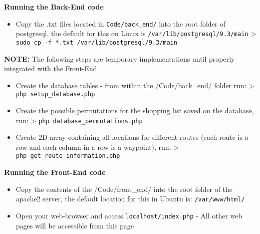 \documentclass[10pt, a4paper, onecolumn]{scrartcl}
\begin{document}
	\textbf{Running the Back-End code} 
	
		\begin{itemize}[noitemsep]
			\item 	Copy the .txt files located in \texttt{Code/back\_end/} into the root
			folder of postgresql, the default for this on Linux is
			\texttt{/var/lib/postgresql/9.3/main} \textgreater{}
			\texttt{sudo\ cp\ -f\ *.txt\ /var/lib/postgresql/9.3/main}
		\end{itemize}
	
	\textbf{NOTE:} The following steps are temporary implementations until
	properly integrated with the Front-End 
	
		\begin{itemize}[noitemsep]
			\item 	Create the database tables - from within the /Code/back\_end/ folder
			run: \textgreater{} \texttt{php\ setup\_database.php}
			\item 	Create the possible permutations for the shopping list saved on the
			database, run: \textgreater{} \texttt{php\ database\_permutations.php}
			\item 	Create 2D array containing all locations for different routes (each
			route is a row and each column in a row is a waypoint), run:
			\textgreater{} \texttt{php\ get\_route\_information.php} 
		\end{itemize}
	
	\textbf{Running the Front-End code} 
	
	
		\begin{itemize}[noitemsep]
			\item 	Copy the contents of the /Code/front\_end/ into the root folder of the
			apache2 server, the default location for this in Ubuntu is: \texttt{/var/www/html/}
			\item 	Open your web-browser and access \texttt{localhost/index.php} - All
			other web pages will be accessible from this page
		\end{itemize}
		

	

	
\end{document}
